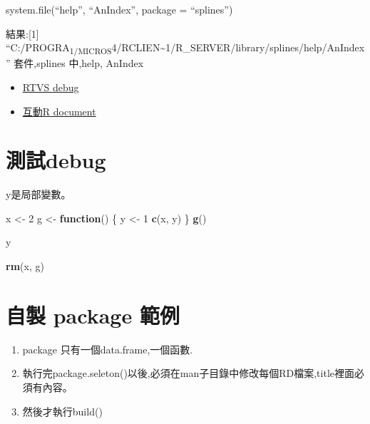\documentclass[]{book}
\newenvironment{Shaded}{\begin{snugshade}}{\end{snugshade}}
\newcommand{\ControlFlowTok}[1]{\textcolor[rgb]{0.13,0.29,0.53}{\textbf{#1}}}
\newcommand{\DecValTok}[1]{\textcolor[rgb]{0.00,0.00,0.81}{#1}}
\newcommand{\KeywordTok}[1]{\textcolor[rgb]{0.13,0.29,0.53}{\textbf{#1}}}
\newcommand{\NormalTok}[1]{#1}
\newcommand{\StringTok}[1]{\textcolor[rgb]{0.31,0.60,0.02}{#1}}
\providecommand{\tightlist}{%
  \setlength{\itemsep}{0pt}\setlength{\parskip}{0pt}}
\theoremstyle{definition}
\theoremstyle{definition}
\theoremstyle{definition}
\theoremstyle{remark}
\begin{document}
system.file(``help'', ``AnIndex'', package = ``splines'')

結果:{[}1{]}
``C:/PROGRA\textsubscript{1/MICROS}4/RCLIEN\textasciitilde{}1/R\_SERVER/library/splines/help/AnIndex''
套件,splines 中,help, AnIndex

\begin{itemize}
\tightlist
\item
  \href{https://docs.microsoft.com/zh-tw/visualstudio/rtvs/debugging-r-in-visual-studio?view=vs-2017}{RTVS
  debug}\\
\item
  \href{https://www.rdocumentation.org/packages/base/versions/3.5.1/topics/attributes}{互動R
  document}
\end{itemize}

\hypertarget{debug}{%
\section{測試debug}\label{debug}}

y是局部變數。

\begin{Shaded}
\begin{Highlighting}[]
\NormalTok{x <-}\StringTok{ }\DecValTok{2}
\NormalTok{g <-}\StringTok{ }\ControlFlowTok{function}\NormalTok{() \{}
\NormalTok{    y <-}\StringTok{ }\DecValTok{1}
    \KeywordTok{c}\NormalTok{(x, y)}
\NormalTok{\}}
\KeywordTok{g}\NormalTok{()}
\end{Highlighting}
\end{Shaded}

\begin{Shaded}
\begin{Highlighting}[]
\NormalTok{y}
\end{Highlighting}
\end{Shaded}

\begin{Shaded}
\begin{Highlighting}[]
\KeywordTok{rm}\NormalTok{(x, g)}
\end{Highlighting}
\end{Shaded}

\hypertarget{-package-}{%
\section{自製 package 範例}\label{-package-}}

\begin{enumerate}
\def\labelenumi{\arabic{enumi}.}
\tightlist
\item
  package 只有一個data.frame,一個函數.\\
\item
  執行完package.seleton()以後,必須在man子目錄中修改每個RD檔案,title裡面必須有內容。\\
\item
  然後才執行build()
\end{enumerate}
\end{document}
